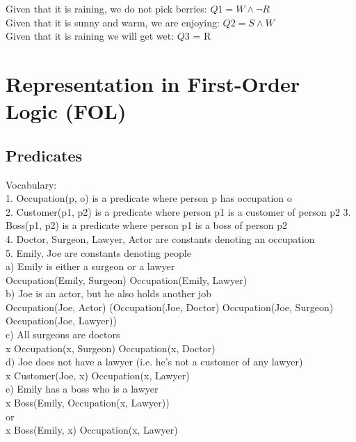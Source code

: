 \documentclass{article}
\begin{document}
\noindent Given that it is raining, we do not pick berries: $Q1 = W \wedge \neg R$\\
Given that it is sunny and warm, we are enjoying: $Q2 = S \wedge W$\\
Given that it is raining we will get wet: $Q3$ = R\\


\section{Representation in First-Order Logic (FOL)}

\subsection{Predicates}

Vocabulary:\\
1. Occupation(p, o) is a predicate where person p has occupation o\\
2. Customer(p1, p2) is a predicate where person p1 is a customer of person p2 3. Boss(p1, p2) is a predicate where person p1 is a boss of person p2\\
4. Doctor, Surgeon, Lawyer, Actor are constants denoting an occupation\\
5. Emily, Joe are constants denoting people\\



a) Emily is either a surgeon or a lawyer\\
Occupation(Emily, Surgeon) \vee Occupation(Emily, Lawyer)\\

b) Joe is an actor, but he also holds another job\\
Occupation(Joe, Actor) \wedge (Occupation(Joe, Doctor) \vee Occupation(Joe, Surgeon) \vee Occupation(Joe, Lawyer))\\

c) All surgeons are doctors\\
\forall x \: Occupation(x, Surgeon) \Rightarrow \: Occupation(x, Doctor)\\

d) Joe does not have a lawyer (i.e. he’s not a customer of any lawyer)\\
\forall x \: Customer(Joe, x) \Rightarrow \neg Occupation(x, Lawyer)\\

e) Emily has a boss who is a lawyer\\
\exists x \: Boss(Emily, Occupation(x, Lawyer))\\
or\\
\exists x \: Boss(Emily, x) \wedge Occupation(x, Lawyer)\\
\end{document}
